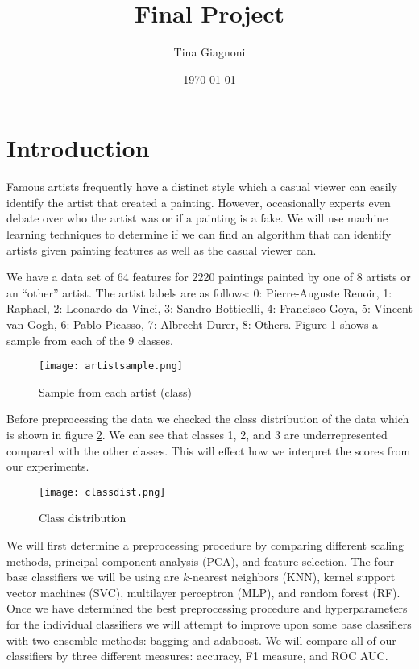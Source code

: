 \documentclass[12pt]{article}
\title{Final Project}
\date{\today}
\author{Tina Giagnoni}
\begin{document}
	\maketitle 
\section{Introduction}

Famous artists frequently have a distinct style which a casual viewer can easily identify the artist that created a painting. However, occasionally experts even debate over who the artist was or if a painting is a fake. We will use machine learning techniques to determine if we can find an algorithm that can identify artists given painting features as well as the casual viewer can. 

We have a data set of 64 features for 2220 paintings painted by one of 8 artists or an ``other'' artist. The artist labels are as follows: 0: Pierre-Auguste Renoir, 1: Raphael, 2: Leonardo da Vinci, 3: Sandro Botticelli, 4: Francisco Goya, 5: Vincent van Gogh, 6: Pablo Picasso, 7: Albrecht Durer, 8: Others. Figure \ref{everyclass} shows a sample from each of the 9 classes.


\begin{figure}[h]
	\centering
	\texttt{[image: artistsample.png]}
	\caption{Sample from each artist (class)}
	\label{everyclass}
\end{figure}

Before preprocessing the data we checked the class distribution of the data which is shown in figure \ref{dist}. We can see that classes 1, 2, and 3 are underrepresented compared with the other classes. This will effect how we interpret the scores from our experiments.

\begin{figure}[h]
\centering
\texttt{[image: classdist.png]}
\caption{Class distribution}
\label{dist}
\end{figure}

We will first determine a preprocessing procedure by comparing different scaling methods, principal component analysis (PCA), and feature selection. The four base classifiers we will be using are $k$-nearest neighbors (KNN), kernel support vector machines (SVC), multilayer perceptron (MLP), and random forest (RF). Once we have determined the best preprocessing procedure and hyperparameters for the individual classifiers we will attempt to improve upon some base classifiers with two ensemble methods: bagging and adaboost. We will compare all of our classifiers by three different measures: accuracy, F1 measure, and ROC AUC.
\end{document}
